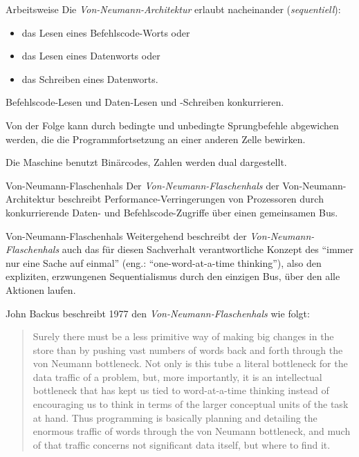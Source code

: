 \begin{defi}{Arbeitsweise}
    Die \emph{Von-Neumann-Architektur} erlaubt nacheinander (\emph{sequentiell}):

    \begin{itemize}
        \item das Lesen eines Befehlscode-Worts oder
        \item das Lesen eines Datenworts oder
        \item das Schreiben eines Datenworts.
    \end{itemize}

    Befehlscode-Lesen und Daten-Lesen und -Schreiben konkurrieren.

    Von der Folge kann durch bedingte und unbedingte Sprungbefehle abgewichen werden, die die Programmfortsetzung an einer anderen Zelle bewirken.

    Die Maschine benutzt Binärcodes, Zahlen werden dual dargestellt.
\end{defi}

\begin{defi}{Von-Neumann-Flaschenhals}
    Der \emph{Von-Neumann-Flaschenhals} der Von-Neumann-Architektur beschreibt Performance-Verringerungen von Prozessoren durch konkurrierende Daten- und Befehlscode-Zugriffe über einen gemeinsamen Bus.
\end{defi}

\begin{bonus}{Von-Neumann-Flaschenhals}
    Weitergehend beschreibt der \emph{Von-Neumann-Flaschenhals} auch das für diesen Sachverhalt verantwortliche Konzept des \enquote{immer nur eine Sache auf einmal} (eng.: \enquote{one-word-at-a-time thinking}), also den expliziten, erzwungenen Sequentialismus durch den einzigen Bus, über den alle Aktionen laufen.

    John Backus beschreibt 1977 den \emph{Von-Neumann-Flaschenhals} wie folgt:
    \begin{quotation}
        Surely there must be a less primitive way of making big changes in the store than by pushing vast numbers of words back and forth through the von Neumann bottleneck.
        Not only is this tube a literal bottleneck for the data traffic of a problem, but, more importantly, it is an intellectual bottleneck that has kept us tied to word-at-a-time thinking instead of encouraging us to think in terms of the larger conceptual units of the task at hand.
        Thus programming is basically planning and detailing the enormous traffic of words through the von Neumann bottleneck, and much of that traffic concerns not significant data itself, but where to find it.
    \end{quotation}
\end{bonus}

